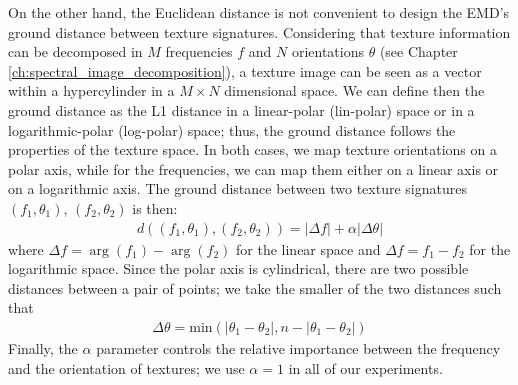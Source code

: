 On the other hand, the Euclidean distance is not convenient to design the EMD's ground distance between texture signatures. Considering that texture information can be decomposed in $M$ frequencies $f$ and $N$ orientations $\theta$ (see Chapter \ref{ch:spectral_image_decomposition}), a texture image can be seen as a vector within a hypercylinder in a $M \times N$ dimensional space. We can define then the ground distance as the L1 distance in a linear-polar (lin-polar) space or in a logarithmic-polar (log-polar) space; thus, the ground distance follows the properties of the texture space. In both cases, we map texture orientations on a polar axis, while for the frequencies, we can map them either on a linear axis or on a logarithmic axis. The ground distance between two texture signatures $(f_1, \theta_1)$, $(f_2, \theta_2)$ is then:
\begin{eqnarray} \label{eq:emd_lin_log_polar}
	d((f_1, \theta_1), (f_2, \theta_2)) = |\Delta f| + \alpha |\Delta \theta|
\end{eqnarray}
where $\Delta f = \arg{(f_1)} - \arg{(f_2)}$ for the linear space and $\Delta f = f_1 - f_2$ for the logarithmic space. Since the polar axis is cylindrical, there are two possible distances between a pair of points; we take the smaller of the two distances such that
\begin{eqnarray} \label{eq:emd_ground_dist_polar_axis}
	\Delta \theta = \mathrm{min}(|\theta_1-\theta_2|, n-|\theta_1-\theta_2|) \nonumber
\end{eqnarray}
Finally, the $\alpha$ parameter controls the relative importance between the frequency and the orientation of textures; we use $\alpha=1$ in all of our experiments.


